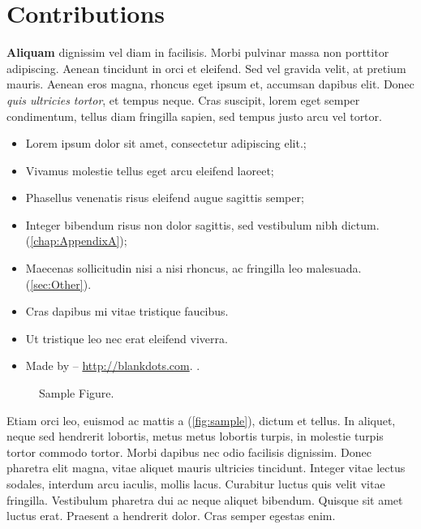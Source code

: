 
\section{Contributions}
\label{sec:ObjectiveContributions}


\textbf{Aliquam} dignissim vel diam in facilisis. Morbi pulvinar massa non porttitor adipiscing. Aenean tincidunt in orci et eleifend. Sed vel gravida velit, at pretium mauris. Aenean eros magna, rhoncus eget ipsum et, accumsan dapibus elit. Donec \textit{quis ultricies tortor}, et tempus neque. Cras suscipit, lorem eget semper condimentum, tellus diam fringilla sapien, sed tempus justo arcu vel tortor.

\begin{itemize}[noitemsep]
	\item Lorem ipsum dolor sit amet, consectetur adipiscing elit.;
	\item Vivamus molestie tellus eget arcu eleifend laoreet;
	\item Phasellus venenatis risus eleifend augue sagittis semper;
	\item Integer bibendum risus non dolor sagittis, sed vestibulum nibh dictum. (\autoref{chap:AppendixA});
	\item Maecenas sollicitudin nisi a nisi rhoncus, ac fringilla leo malesuada. (\autoref{sec:Other}).
\end{itemize}


\begin{itemize}[noitemsep]
    \item Cras dapibus mi vitae tristique faucibus.
    \item Ut tristique leo nec erat eleifend viverra.
    \item Made by -- \url{http://blankdots.com}.
    .
\end{itemize}

\begin{figure}[h]
		\centering
		{}
		\caption{Sample Figure.}
		\label{fig:sample}
\end{figure}
Etiam orci leo, euismod ac mattis a (\autoref{fig:sample}), dictum et tellus. In aliquet, neque sed hendrerit lobortis, metus metus lobortis turpis, in molestie turpis tortor commodo tortor. Morbi dapibus nec odio facilisis dignissim. Donec pharetra elit magna, vitae aliquet mauris ultricies tincidunt. Integer vitae lectus sodales, interdum arcu iaculis, mollis lacus. Curabitur luctus quis velit vitae fringilla. Vestibulum pharetra dui ac neque aliquet bibendum. Quisque sit amet luctus erat. Praesent a hendrerit dolor. Cras semper egestas enim.

